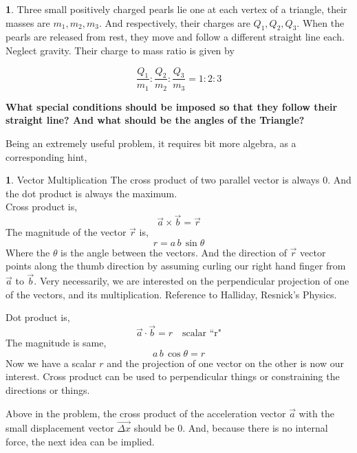 \documentclass[11pt,a4paper,landscape,twocolumn]{article}
\theoremstyle{definition}
\newtheorem{fct}{ \framebox[0.05\textwidth]{{\sffamily Fact}} }
\theoremstyle{definition}
\newtheorem{pr}{ \framebox[0.05\textwidth]{{\sffamily Pr}} }
\theoremstyle{definition}
\theoremstyle{definition}
\begin{document}
\begin{pr}
Three small positively charged pearls lie one at each vertex of a triangle, their masses are $m_1,m_2,m_3$. And respectively, their charges are $Q_1, Q_2, Q_3$. When the pearls are released from rest, they move and follow a different straight line each. Neglect gravity. Their charge to mass ratio is given by 

\[ \frac{Q_1}{m_1} : \frac{Q_2}{m_2} : \frac{Q_3}{m_3} = 1:2:3 \]

\textbf{What special conditions should be imposed so that they follow their straight line? And what should be the angles of the Triangle?}
\end{pr}

Being an extremely useful problem, it requires bit more algebra, as a corresponding hint, 

\begin{fct} \textsf{Vector Multiplication}
The cross product of two parallel vector is always 0. And the dot product is always the maximum. \\

Cross product is,
\[ \vec{a} \times \vec{b} = \vec{r} \]
The magnitude of the vector $\vec{r}$ is,
\[ r = a \, b \, \sin \theta \]
Where the $\theta$ is the angle between the vectors. And the direction of $\vec{r}$ vector points along the thumb direction by assuming curling our right hand finger from $\vec{a}$ to $\vec{b}$. Very necessarily, we are interested on the perpendicular projection of one of the vectors, and its multiplication. Reference to Halliday, Resnick's Physics.


Dot product is,
\[ \vec{a} \cdot \vec{b} = r \quad \text{scalar ``r"} \]
The magnitude is same,
\[ a \, b \, \cos \theta = r \]
Now we have a scalar $r$ and the projection of one vector on the other is now our interest.
%
Cross product can be used to perpendicular things or constraining the directions or things.

\end{fct}

Above in the problem, the cross product of the acceleration vector $\vec{a}$ with the small displacement vector $\vec{\Delta x}$ should be $0$. And, because there is no internal force, the next idea can be implied.
\end{document}
